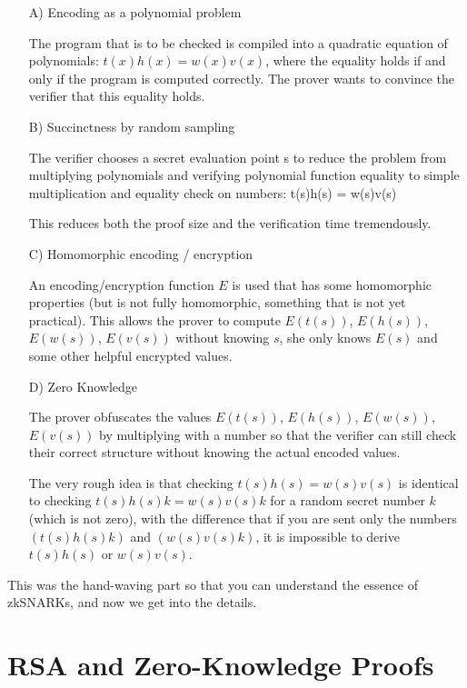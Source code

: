 \documentclass[11pt,letterpaper]{article}
\begin{document}
\begin{itemize}
\item[A)] Encoding as a polynomial problem

The program that is to be checked is compiled into a quadratic equation of polynomials: $t(x) h(x) = w(x) v(x)$, where the equality holds if and only if the program is computed correctly. The prover wants to convince the verifier that this equality holds.

\item[B)] Succinctness by random sampling

The verifier chooses a secret evaluation point s to reduce the problem from multiplying polynomials and verifying polynomial function equality to simple multiplication and equality check on numbers: t(s)h(s) = w(s)v(s)

This reduces both the proof size and the verification time tremendously.

\item[C)] Homomorphic encoding / encryption

An encoding/encryption function $E$ is used that has some homomorphic properties (but is not fully homomorphic, something that is not yet practical). This allows the prover to compute $E(t(s))$, $E(h(s))$, $E(w(s))$, $E(v(s))$ without knowing $s$, she only knows $E(s)$ and some other helpful encrypted values.

\item[D)] Zero Knowledge

The prover obfuscates the values $E(t(s))$, $E(h(s))$, $E(w(s))$, $E(v(s))$ by multiplying with a number so that the verifier can still check their correct structure without knowing the actual encoded values.

The very rough idea is that checking $t(s)h(s) = w(s)v(s)$ is identical to checking $t(s)h(s) k = w(s)v(s) k$ for a random secret number $k$ (which is not zero), with the difference that if you are sent only the numbers $(t(s)h(s) k)$ and $(w(s)v(s) k)$, it is impossible to derive $t(s)h(s)$ or $w(s)v(s)$.

\end{itemize}

This was the hand-waving part so that you can understand the essence of zkSNARKs, and now we get into the details.

\section{RSA and Zero-Knowledge Proofs}
\end{document}
